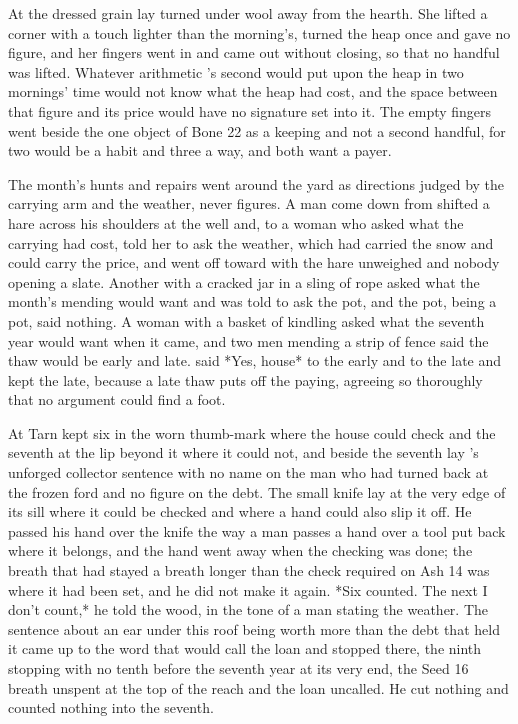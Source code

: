 At  the dressed grain lay turned under wool away from the hearth. She lifted a corner with a touch lighter than the morning's, turned the heap once and gave no figure, and her fingers went in and came out without closing, so that no handful was lifted. Whatever arithmetic 's second would put upon the heap in two mornings' time would not know what the heap had cost, and the space between that figure and its price would have no signature set into it. The empty fingers went beside the one object of Bone 22 as a keeping and not a second handful, for two would be a habit and three a way, and both want a payer.

The month's hunts and repairs went around the yard as directions judged by the carrying arm and the weather, never figures. A man come down from  shifted a hare across his shoulders at the well and, to a woman who asked what the carrying had cost, told her to ask the weather, which had carried the snow and could carry the price, and went off toward  with the hare unweighed and nobody opening a slate. Another with a cracked jar in a sling of rope asked what the month's mending would want and was told to ask the pot, and the pot, being a pot, said nothing. A woman with a basket of kindling asked what the seventh year would want when it came, and two men mending a strip of fence said the thaw would be early and late.  said *Yes, house* to the early and to the late and kept the late, because a late thaw puts off the paying, agreeing so thoroughly that no argument could find a foot.

\scenebreak

At  Tarn kept six in the worn thumb-mark where the house could check and the seventh at the lip beyond it where it could not, and beside the seventh lay 's unforged collector sentence with no name on the man who had turned back at the frozen ford and no figure on the debt. The small knife lay at the very edge of its sill where it could be checked and where a hand could also slip it off. He passed his hand over the knife the way a man passes a hand over a tool put back where it belongs, and the hand went away when the checking was done; the breath that had stayed a breath longer than the check required on Ash 14 was where it had been set, and he did not make it again. *Six counted. The next I don't count,* he told the wood, in the tone of a man stating the weather. The sentence about an ear under this roof being worth more than the debt that held it came up to the word that would call the loan and stopped there, the ninth stopping with no tenth before the seventh year at its very end, the Seed 16 breath unspent at the top of the reach and the loan uncalled. He cut nothing and counted nothing into the seventh.

